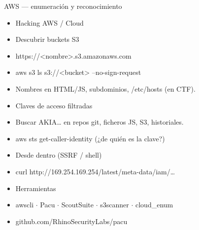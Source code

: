 \documentclass[aspectratio=169,10pt]{beamer}
\begin{document}
\begin{frame}[allowframebreaks]{AWS --- enumeración y reconocimiento}
\small
  \begin{itemize}
  \item Hacking AWS / Cloud
  \item Descubrir buckets S3
  \item https://\textless{}nombre\textgreater{}.s3.amazonaws.com
  \item aws s3 ls s3://\textless{}bucket\textgreater{} --no-sign-request
  \item Nombres en HTML/JS, subdominios, /etc/hosts (en CTF).
  \item Claves de acceso filtradas
  \item Buscar AKIA\dots{} en repos git, ficheros JS, S3, historiales.
  \item aws sts get-caller-identity (¿de quién es la clave?)
  \item Desde dentro (SSRF / shell)
  \item curl http://169.254.169.254/latest/meta-data/iam/\dots{}
  \item Herramientas
  \item awscli $\cdot$ Pacu $\cdot$ ScoutSuite $\cdot$ s3scanner $\cdot$ cloud\_enum
  \item github.com/RhinoSecurityLabs/pacu
  \end{itemize}
\end{frame}
\end{document}
